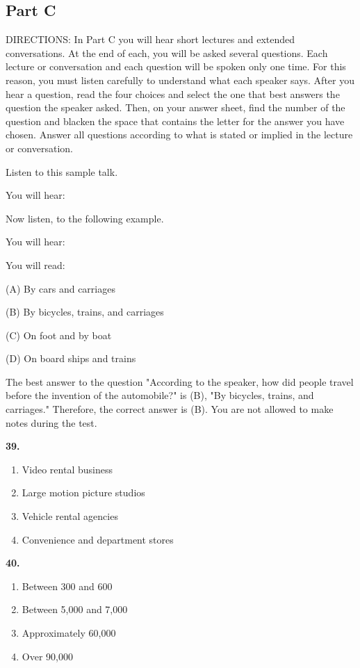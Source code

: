 \documentclass[12pt]{article}
\begin{document}
\subsection*{Part C}
DIRECTIONS: In Part C you will hear short lectures and extended conversations. At the end of each, you will be asked several questions. Each lecture or conversation and each question will be spoken only one time. For this reason, you must listen carefully to understand what each speaker says. After you hear a question, read the four choices and select the one that best answers the question the speaker asked. Then, on your answer sheet, find the number of the question and blacken the space that contains the letter for the answer you have chosen. Answer all questions according to what is stated or implied in the lecture or conversation.\par
\begin{exampleblock}
Listen to this sample talk.\par
You will hear:\par
Now listen, to the following example.\par
You will hear:\par
You will read:\par
(A) By cars and carriages\par
(B) By bicycles, trains, and carriages\par
(C) On foot and by boat\par
(D) On board ships and trains\par
The best answer to the question "According to the speaker, how did people travel before the invention of the automobile?" is (B), "By bicycles, trains, and carriages." Therefore, the correct answer is (B). You are not allowed to make notes during the test.\par
\end{exampleblock}
\noindent\textbf{39.}
\begin{enumerate}[label=(\Alph*),leftmargin=*,itemsep=0.2em]
\item Video rental business
\item Large motion picture studios
\item Vehicle rental agencies
\item Convenience and department stores
\end{enumerate}
\par
\vspace{0.25\baselineskip}
\noindent\textbf{40.}
\begin{enumerate}[label=(\Alph*),leftmargin=*,itemsep=0.2em]
\item Between 300 and 600
\item Between 5,000 and 7,000
\item Approximately 60,000
\item Over 90,000
\end{enumerate}
\end{document}

